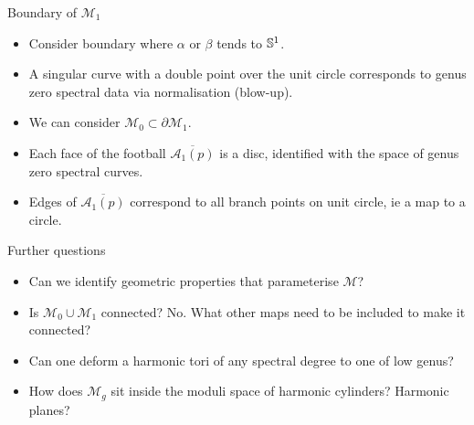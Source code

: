 \documentclass[xcolor=dvipsnames]{beamer}
\begin{document}
\begin{frame}{Boundary of $\mathcal{M}_1$}
\begin{itemize}
\item Consider boundary where $α$ or $β$ tends to $\S^1$.
\item A singular curve with a double point over the unit circle corresponds to genus zero spectral data via normalisation (blow-up).
\item We can consider $\mathcal{M}_0 \subset \partial \mathcal{M}_1$.
\item Each face of the football $\overline{\mathcal{A}_1(p)}$ is a disc, identified with the space of genus zero spectral curves. 
\item Edges of $\overline{\mathcal{A}_1(p)}$ correspond to all branch points on unit circle, ie a map to a circle.
\end{itemize}
\end{frame}


\begin{frame}{Further questions}
\begin{itemize}
\item Can we identify geometric properties that parameterise $\mathcal{M}$?
\item Is $\mathcal{M}_0 \cup \mathcal{M}_1$ connected? No.
What other maps need to be included to make it connected? 
\item Can one deform a harmonic tori of any spectral degree to one of low genus?
\item How does $\mathcal{M}_g$ sit inside the moduli space of harmonic cylinders? Harmonic planes?
\end{itemize}
\end{frame}
\end{document}
